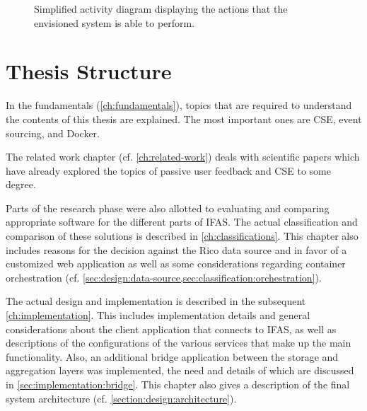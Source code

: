 \begin{figure}[ht]
        \caption{Simplified activity diagram displaying the actions that the envisioned system is able to perform.}
        \label{fig:system:vision}
\end{figure}


\section{Thesis Structure}
\label{sec:intro:structure}

In the fundamentals (\cref{ch:fundamentals}), topics that are required to understand the contents of this thesis are explained.
The most important ones are \acf{CSE}, event sourcing, and Docker.

The related work chapter (cf. \cref{ch:related-work}) deals with scientific papers which have already explored the topics of passive user feedback and \ac{CSE} to some degree.

Parts of the research phase were also allotted to evaluating and comparing appropriate software for the different parts of \ac{IFAS}.
The actual classification and comparison of these solutions is described in \cref{ch:classifications}.
This chapter also includes reasons for the decision against the Rico data source and in favor of a customized web application as well as some considerations regarding container orchestration (cf. \cref{sec:design:data-source,sec:classification:orchestration}).

The actual design and implementation is described in the subsequent \cref{ch:implementation}.
This includes implementation details and general considerations about the client application that connects to \ac{IFAS}, as well as descriptions of the configurations of the various services that make up the main functionality.
Also, an additional bridge application between the storage and aggregation layers was implemented, the need and details of which are discussed in \cref{sec:implementation:bridge}.
This chapter also gives a description of the final system architecture (cf. \cref{section:design:architecture}).


